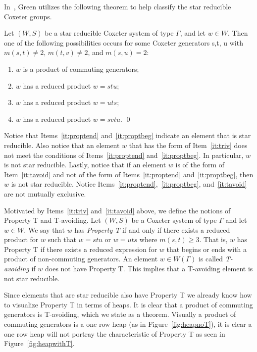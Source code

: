 In~\cite{Green2006a}, Green utilizes the following theorem to help classify the star reducible Coxeter groups. 
\begin{theorem}\label{thm:starred}
	Let $(W,S)$ be a star reducible Coxeter system of type $\Gamma$, and let $w \in W$. Then one of the following possibilities occurs for some Coxeter generators s,t, u with $m(s,t) \neq 2$, $m(t,v) \neq 2$, and $m(s,u)=2$:
	\begin{enumerate}[leftmargin=2cm]
	\item $w$ is a product of commuting generators;\label{it:triv}
	\item $w$ has a reduced product $w=stu$;\label{it:proptend}
	\item $w$ has a reduced product $w=uts$;\label{it:proptbeg}
	\item $w$ has a reduced product $w=svtu$.\label{it:tavoid}	\qed
	\end{enumerate}
\end{theorem}

Notice that Items~\ref{it:proptend} and~\ref{it:proptbeg} indicate an element that is star reducible. Also notice that an element $w$ that has the form of Item~\ref{it:triv} does not meet the conditions of Items~\ref{it:proptend} and~\ref{it:proptbeg}. In particular, $w$ is not star reducible. Lastly, notice that if an element $w$ is of the form of Item~\ref{it:tavoid} and not of the form of Items~\ref{it:proptend} and~\ref{it:proptbeg}, then $w$ is not star reducible. Notice Items~\ref{it:proptend},~\ref{it:proptbeg}, and~\ref{it:tavoid} are not mutually exclusive.

Motivated by Items~\ref{it:triv} and~\ref{it:tavoid} above, we define the notions of Property T and T-avoiding. Let $(W,S)$ be a Coxeter system of type $\Gamma$ and let $w \in W$. We say that $w$ has \emph{Property T} if and only if there exists a reduced product for $w$ such that $w=stu$ or $w=uts$ where $m(s,t)\geq 3$. That is, $w$ has Property T if there exists a reduced expression for $w$ that begins or ends with a product of non-commuting generators. An element $w \in W(\Gamma)$ is called \emph{T-avoiding} if $w$ does not have Property T. This implies that a T-avoiding element is not star reducible.

 Since elements that are star reducible also have Property T we already know how to visualize Property T in terms of heaps. It is clear that a product of commuting generators is T-avoiding, which we state as a theorem. Visually a product of commuting generators is a one row heap (as in Figure~\ref{fig:heapnoT}), it is clear a one row heap will not portray the characteristic of Property T as seen in Figure~\ref{fig:heapwithT}.



